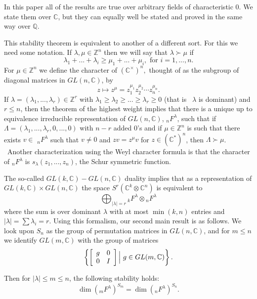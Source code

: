 \documentclass[12pt]{article}%
\begin{document}
In this paper all of the results are true over arbitrary fields of
characteristic $0.$ We state them over $\mathbb{C}$, but they can equally well
be stated and proved in the same way over $\mathbb{Q}$.

This stability theorem is equivalent to another of a different sort. For this
we need some notation. If $\lambda,\mu\in\mathbb{Z}^{n}$ then we will say that
$\lambda\succ\mu$ if
\[
\lambda_{1}+...+\lambda_{i}\geq\mu_{1}+...+\mu_{i}, \text{ for } i=1,...,n.
\]
For $\mu\in\mathbb{Z}^{n}$ we define the character of $\left(  \mathbb{C}%
^{\times}\right)  ^{n},$ thought of as the subgroup of diagonal matrices in
$GL(n,\mathbb{C})$, by
\[
z\mapsto z^{\mu}=z_{1}^{\mu_{1}}z_{2}^{\mu_{2}}\cdots z_{n}^{\mu_{n}}.
\]
If $\lambda=(\lambda_{1},...,\lambda_{r}) \in\mathbb{Z}^{r}$ with $\lambda
_{1}\geq\lambda_{2}\geq...\geq\lambda_{r}\geq0 $ (that is \ $\lambda$ is
dominant) and $r\leq n$, then the theorem of the highest weight implies that
there is a unique up to equivalence irreducible representation of
$GL(n,\mathbb{C})$, ${}_{n}F^{\lambda}$, such that if $\Lambda=(\lambda
_{1},...,\lambda_{r},0,...,0)$ with $n-r$ added $0$'s and if $\mu\in
\mathbb{Z}^{n}$ is such that there exists $v\in$ ${}_{n}F^{\lambda}$ such that
$v\neq0$ and $zv=z^{\mu}v$ for $z \in(\mathbb{C}^{*})^{n}$, then $\Lambda
\succ\mu$. \ Another characterization using the Weyl character formula is that
the character of ${}_{n}F^{\lambda}$ is $s_{\lambda}(z_{1},...,z_{n})$, the
Schur symmetric function.

The so-called $GL(k,\mathbb{C})-GL(n,\mathbb{C})$ duality implies that as a
representation of $GL(k,\mathbb{C})\times GL(n,\mathbb{C})$ the space
$S^{r}(\mathbb{C}^{k}\otimes\mathbb{C}^{n})$ is equivalent to%
\[
\bigoplus_{\left\vert \lambda\right\vert =r}{}_{k}F^{\lambda}\otimes{}%
_{n}F^{\lambda}%
\]
where the sum is over dominant $\lambda$ with at most $\min(k,n)$ entries and
$\left\vert \lambda\right\vert =\sum\lambda_{i} = r$. Using this formalism,
our second main result is as follows. We look upon $S_{n}$ as the group of
permutation matrices in $GL(n,\mathbb{C})$, and for $m \leq n$ we identify
$GL(m,\mathbb{C})$ with the group of matrices
\[
\left\{  \left[
\begin{array}
[c]{cc}%
g & 0\\
0 & I
\end{array}
\right]  \Big| ~g\in GL(m,\mathbb{C})\right\}  .
\]


Then for $\left\vert \lambda\right\vert \leq m\leq n$, the following stability
holds:
\[
\dim\left(  {}_{m}F^{\lambda}\right)  ^{S_{m}}=\dim\left(  {}_{n}F^{\lambda
}\right)  ^{S_{n}}.
\]
\end{document}
